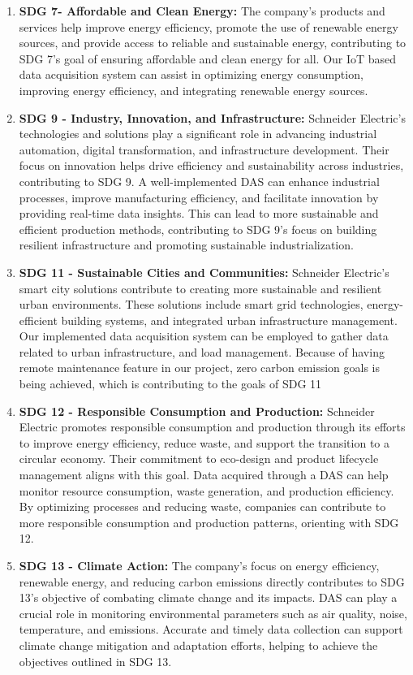 \begin{enumerate}

\item\textbf{SDG 7- Affordable and Clean Energy:} The company's products and services help improve energy efficiency, promote the use of renewable energy sources, and provide access to reliable and sustainable energy, contributing to SDG 7's goal of ensuring affordable and clean energy for all. Our IoT based data acquisition system can assist in optimizing energy consumption, improving energy efficiency, and integrating renewable energy sources.

\item\textbf{SDG 9 - Industry, Innovation, and Infrastructure:} Schneider Electric's technologies and solutions play a significant role in advancing industrial automation, digital transformation, and infrastructure development. Their focus on innovation helps drive efficiency and sustainability across industries, contributing to SDG 9. A well-implemented DAS can enhance industrial processes, improve manufacturing efficiency, and facilitate innovation by providing real-time data insights. This can lead to more sustainable and efficient production methods, contributing to SDG 9's focus on building resilient infrastructure and promoting sustainable industrialization.

\item\textbf{SDG 11 - Sustainable Cities and Communities:} Schneider Electric's smart city solutions contribute to creating more sustainable and resilient urban environments. These solutions include smart grid technologies, energy-efficient building systems, and integrated urban infrastructure management. Our implemented data acquisition system can be employed to gather data related to urban infrastructure, and load management. Because of having remote maintenance feature in our project, zero carbon emission goals is being achieved, which is contributing to the goals of SDG 11


\item\textbf{SDG 12 - Responsible Consumption and Production: }Schneider Electric promotes responsible consumption and production through its efforts to improve energy efficiency, reduce waste, and support the transition to a circular economy. Their commitment to eco-design and product lifecycle management aligns with this goal. Data acquired through a DAS can help monitor resource consumption, waste generation, and production efficiency. By optimizing processes and reducing waste, companies can contribute to more responsible consumption and production patterns, orienting with SDG 12.

\item\textbf{SDG 13 - Climate Action:} The company's focus on energy efficiency, renewable energy, and reducing carbon emissions directly contributes to SDG 13's objective of combating climate change and its impacts. DAS can play a crucial role in monitoring environmental parameters such as air quality, noise, temperature, and emissions. Accurate and timely data collection can support climate change mitigation and adaptation efforts, helping to achieve the objectives outlined in SDG 13.

\end{enumerate}

